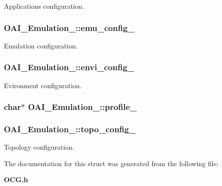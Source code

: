 Applications configuration. 

\subsubsection[{emu\_\-config\_\-}]{ {\bf OAI\_\-Emulation\_\-::emu\_\-config\_\-}}\label{structOAI__Emulation___adc6af4aea4305fab5ee867b8cdca4a4}


Emulation configuration. 

\subsubsection[{envi\_\-config\_\-}]{ {\bf OAI\_\-Emulation\_\-::envi\_\-config\_\-}}\label{structOAI__Emulation___cfd0980a1650514147d9906da003a3dc}


Evironment configuration. 

\subsubsection[{profile\_\-}]{\setlength{\rightskip}{0pt plus 5cm}char$\ast$ {\bf OAI\_\-Emulation\_\-::profile\_\-}}\label{structOAI__Emulation___8cc92c952b3dac459225a78df7048b27}


\subsubsection[{topo\_\-config\_\-}]{ {\bf OAI\_\-Emulation\_\-::topo\_\-config\_\-}}\label{structOAI__Emulation___f870af344a4c1ba8f976d202afa35cdb}


Topology configuration. 



The documentation for this struct was generated from the following file:\begin{CompactItemize}
\item 
{\bf OCG.h}\end{CompactItemize}
